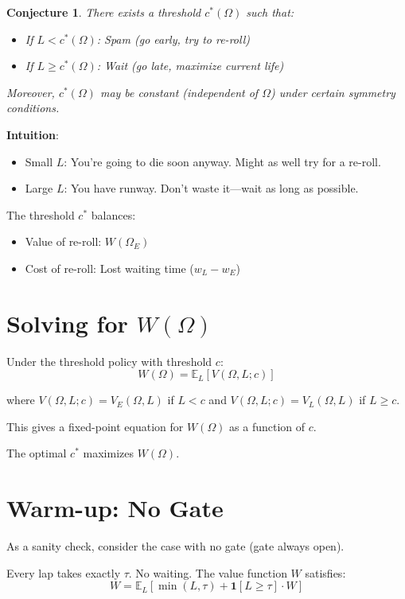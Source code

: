 \documentclass{article}
\newcommand{\E}{\mathbb{E}}
\newcommand{\ind}{\mathbf{1}}
\newtheorem{conjecture}{Conjecture}
\begin{document}
\begin{conjecture}
There exists a threshold $c^*(\Omega)$ such that:
\begin{itemize}
    \item If $L < c^*(\Omega)$: Spam (go early, try to re-roll)
    \item If $L \geq c^*(\Omega)$: Wait (go late, maximize current life)
\end{itemize}

Moreover, $c^*(\Omega)$ may be constant (independent of $\Omega$) under certain symmetry conditions.
\end{conjecture}

\textbf{Intuition}: 
\begin{itemize}
    \item Small $L$: You're going to die soon anyway. Might as well try for a re-roll.
    \item Large $L$: You have runway. Don't waste it—wait as long as possible.
\end{itemize}

The threshold $c^*$ balances:
\begin{itemize}
    \item Value of re-roll: $W(\Omega_E)$
    \item Cost of re-roll: Lost waiting time ($w_L - w_E$)
\end{itemize}

\section{Solving for $W(\Omega)$}

Under the threshold policy with threshold $c$:
\[
W(\Omega) = \E_L[V(\Omega, L; c)]
\]

where $V(\Omega, L; c) = V_E(\Omega, L)$ if $L < c$ and $V(\Omega, L; c) = V_L(\Omega, L)$ if $L \geq c$.

This gives a fixed-point equation for $W(\Omega)$ as a function of $c$.

The optimal $c^*$ maximizes $W(\Omega)$.

\section{Warm-up: No Gate}

As a sanity check, consider the case with no gate (gate always open).

Every lap takes exactly $\tau$. No waiting. The value function $W$ satisfies:
\[
W = \E_L[\min(L, \tau) + \ind[L \geq \tau] \cdot W]
\]
\end{document}
